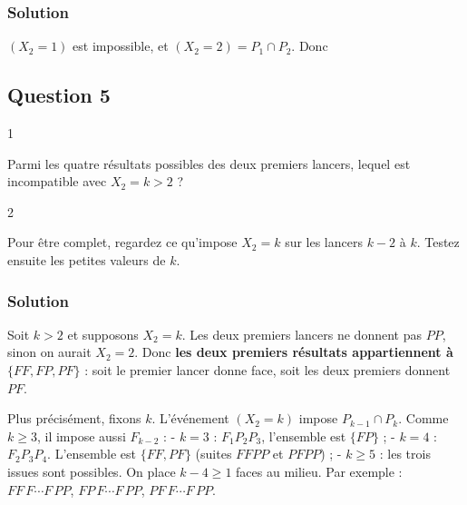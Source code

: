 \documentclass[11pt,a4paper]{article}
\newcommand{\equationajustee}[1]{%
  \sbox{\boiteequation}{$\displaystyle #1$}%
  \ifdim\wd\boiteequation>\linewidth
    \[\resizebox{\linewidth}{!}{\usebox{\boiteequation}}\]%
  \else
    \[#1\]%
  \fi}
\begin{document}
\hypertarget{solution-3}{%
\subsubsection{Solution}\label{solution-3}}

\((X_2=1)\) est impossible, et \((X_2=2)=P_1\cap P_2\). Donc
\equationajustee{\boxed{\begin{aligned}
P(X_2=1)&=0,\\
P(X_2=2)&=p^2.
\end{aligned}}}

\hypertarget{question-5}{%
\subsection{Question 5}\label{question-5}}

\begin{indication}{1}

Parmi les quatre résultats possibles des deux premiers lancers, lequel est incompatible avec \(X_2=k>2\) ?

\end{indication}

\begin{indication}{2}

Pour être complet, regardez ce qu'impose \(X_2=k\) sur les lancers \(k-2\) à \(k\). Testez ensuite les petites valeurs de \(k\).

\end{indication}

\hypertarget{solution-4}{%
\subsubsection{Solution}\label{solution-4}}

Soit \(k>2\) et supposons \(X_2=k\). Les deux premiers lancers ne donnent pas \(PP\), sinon on aurait \(X_2=2\). Donc \textbf{les deux premiers résultats appartiennent à \(\{FF,FP,PF\}\)} : soit le premier lancer donne face, soit les deux premiers donnent \(PF\).

Plus précisément, fixons \(k\). L'événement \((X_2=k)\) impose \(P_{k-1}\cap P_k\). Comme \(k\geqslant3\), il impose aussi \(F_{k-2}\) :
- \(k=3\) : \(F_1P_2P_3\), l'ensemble est \(\{FP\}\) ;
- \(k=4\) : \(F_2P_3P_4\). L'ensemble est \(\{FF,PF\}\) (suites \(FFPP\) et \(PFPP\)) ;
- \(k\geqslant5\) : les trois issues sont possibles. On place \(k-4\geqslant1\) faces au milieu. Par exemple : \(FF\,F\cdots F\,PP\), \(FP\,F\cdots F\,PP\), \(PF\,F\cdots F\,PP\).
\end{document}

